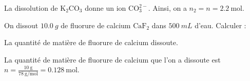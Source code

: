 \begin{corrige}
La dissolution de $\textrm{K}_2\textrm{C}\textrm{O}_3$ donne un ion $\textrm{C}\textrm{O}_3^{2-}$. Ainsi, on a $n_2=n=\SI{2,2}{\mol}$.
\end{corrige}


\finEntrainement



\hauteurLargeurCadreReponse		{7mm}{4cm}
\typeEntrainement				{} %
\initialisationEntrainement


\debutEntrainement

On dissout $\SI{10,0}{g}$ de fluorure de calcium $\textrm{Ca}\textrm{F}_2$ dans $\SI{500}{mL}$ d'eau. Calculer :


\begin{enonce}
La quantité de matière de fluorure de calcium dissoute.
\end{enonce}


\begin{corrige}
La quantité de matière de fluorure de calcium que l'on a dissoute est $n=\frac{\SI{10}{\gram}}{\SI{78}{\gram\per\mol}}=\SI{0,128}{\mol}$.
\end{corrige}


